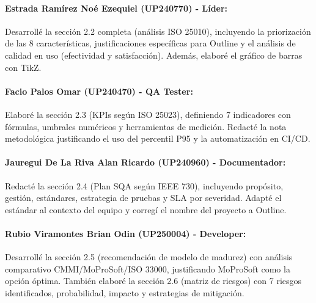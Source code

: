 \documentclass[12pt]{article}
\begin{document}
\paragraph{Estrada Ramírez Noé Ezequiel (UP240770) - Líder:}
Desarrollé la sección 2.2 completa (análisis ISO 25010), incluyendo la priorización de las 8 características, justificaciones específicas para Outline y el análisis de calidad en uso (efectividad y satisfacción). Además, elaboré el gráfico de barras con TikZ.

\paragraph{Facio Palos Omar (UP240470) - QA Tester:}
Elaboré la sección 2.3 (KPIs según ISO 25023), definiendo 7 indicadores con fórmulas, umbrales numéricos y herramientas de medición. Redacté la nota metodológica justificando el uso del percentil P95 y la automatización en CI/CD.

\paragraph{Jauregui De La Riva Alan Ricardo (UP240960) - Documentador:}
Redacté la sección 2.4 (Plan SQA según IEEE 730), incluyendo propósito, gestión, estándares, estrategia de pruebas y SLA por severidad. Adapté el estándar al contexto del equipo y corregí el nombre del proyecto a Outline.

\paragraph{Rubio Viramontes Brian Odin (UP250004) - Developer:}
Desarrollé la sección 2.5 (recomendación de modelo de madurez) con análisis comparativo CMMI/MoProSoft/ISO 33000, justificando MoProSoft como la opción óptima. También elaboré la sección 2.6 (matriz de riesgos) con 7 riesgos identificados, probabilidad, impacto y estrategias de mitigación.

\newpage
\printbibliography[title={Referencias}]
\end{document}

